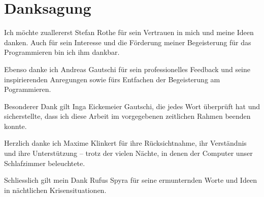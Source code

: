\chapter*{Danksagung}
\label{cha:ack}

\begingroup
\fontsize{12pt}{14pt}\selectfont

Ich möchte zuallererst Stefan Rothe für sein Vertrauen in mich und meine Ideen danken.  
Auch für sein Interesse und die Förderung meiner Begeisterung für das Programmieren bin ich ihm dankbar.

Ebenso danke ich Andreas Gautschi für sein professionelles Feedback und seine inspirierenden Anregungen sowie fürs Entfachen der Begeisterung am Pogrammieren.

Besonderer Dank gilt Inga Eickemeier Gautschi, die jedes Wort überprüft hat und sicherstellte, dass ich diese Arbeit im vorgegebenen zeitlichen Rahmen beenden konnte.

Herzlich danke ich Maxime Klinkert für ihre Rücksichtnahme, ihr Verständnis und ihre Unterstützung – trotz der vielen Nächte, in denen der Computer unser Schlafzimmer beleuchtete.

Schliesslich gilt mein Dank Rufus Spyra für seine ermunternden Worte und Ideen in nächtlichen Krisensituationen.

\endgroup